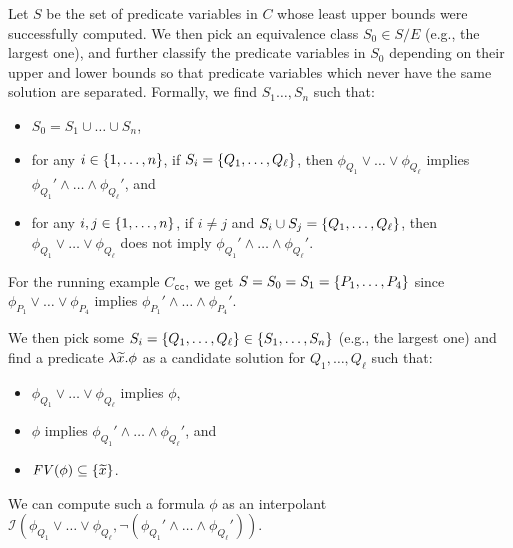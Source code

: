 Let \(S\) be the set of predicate variables in \(C\) whose least upper 
bounds were successfully computed.  We then pick an equivalence class 
\(S_0 \in S / E\) (e.g., the largest one), and further classify the 
predicate variables in \(S_0\) depending on their upper and lower bounds 
so that predicate variables which never have the same solution are 
separated.
%
Formally, we find \(S_1\dots,S_n\) such that:
\begin{itemize}
\item \(S_0 = S_1 \cup \dots \cup S_n\),
\item for any \(i \in \{{1,\dots,n}\}\), if \(S_i 
=\{{Q_1,\dots,Q_{\ell}}\}\), then \(\phi_{Q_1} \lor \dots \lor 
\phi_{Q_{\ell}}\) implies \(\phi_{Q_1}' \land \dots \land 
\phi_{Q_{\ell}}'\), and \item for any \(i,j \in \{{1,\dots,n}\}\), if 
\(i \neq j\) and \(S_i \cup S_j = \{{Q_1,\dots,Q_{\ell}}\}\), then 
\(\phi_{Q_1} \lor \dots \lor \phi_{Q_{\ell}}\) does not imply 
\(\phi_{Q_1}' \land \dots \land \phi_{Q_{\ell}}'\).
\end{itemize}
For the running example \(C_{\texttt{cc}}\), we get 
\(S=S_0=S_1=\{{P_1,\dots,P_4}\}\) since \(\phi_{P_1} \lor \dots 
\lor\phi_{P_4}\) implies \(\phi_{P_1}' \land \dots \land \phi_{P_4}'\).

We then pick some \(S_i = \{{Q_1,\dots,Q_{\ell}}\} \in 
\{{S_1,\dots,S_n}\}\) (e.g., the largest one) and find a predicate 
\(\lambda\widetilde{x}.\phi\) as a candidate solution for 
\(Q_1,\dots,Q_{\ell}\) such that:
\begin{itemize}
\item \(\phi_{Q_1} \lor \dots \lor \phi_{Q_{\ell}}\) implies \(\phi\),
\item \(\phi\) implies \(\phi_{Q_1}' \land \dots \land \phi_{Q_{\ell}}'\), and
\item \(\mathit{FV}({\phi}) \subseteq \{{\widetilde{x}}\}\).
\end{itemize}
We can compute such a formula \(\phi\) as an interpolant 
\(\mathcal{I}(\phi_{Q_1} \lor \dots \lor \phi_{Q_{\ell}},\neg 
(\phi_{Q_1}' \land \dots \land \phi_{Q_{\ell}}'))\).

